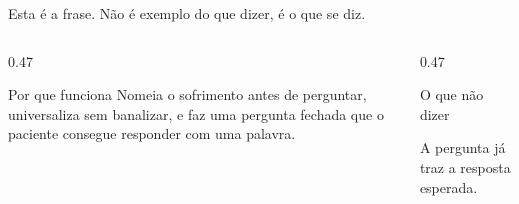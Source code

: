 \begin{frame}{}
{\footnotesize Esta \'e a frase. N\~ao \'e exemplo do que dizer, \'e o que se
diz.\par}

\CRvg
\begin{center}
\end{center}

\CRvg
\begin{columns}[onlytextwidth, t]
\begin{column}{0.47\textwidth}
\begin{caixaproteger}{Por que funciona}
Nomeia o sofrimento antes de perguntar, universaliza sem banalizar, e faz uma
pergunta fechada que o paciente consegue responder com uma palavra.
\end{caixaproteger}
\end{column}
\calha
\begin{column}{0.47\textwidth}
\begin{caixaagir}{O que n\~ao dizer}
\par
\vspace{0.06cm}
A pergunta j\'a traz a resposta esperada.
\end{caixaagir}
\end{column}
\end{columns}
\end{frame}

